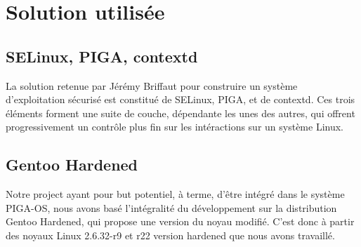 \section{Solution utilisée}


\subsection{SELinux, PIGA, contextd}

La solution retenue par Jérémy Briffaut pour construire un système d'exploitation sécurisé est constitué de SELinux, PIGA, et de contextd. Ces trois éléments forment une suite de couche, dépendante les unes des autres, qui offrent progressivement un contrôle plus fin sur les intéractions sur un système Linux.

\subsection{Gentoo Hardened}

Notre project ayant pour but potentiel, à terme, d'être intégré dans le système PIGA-OS, nous avons basé l'intégralité du développement sur la distribution Gentoo Hardened, qui propose une version du noyau modifié. C'est donc à partir des noyaux Linux 2.6.32-r9 et r22 version hardened que nous avons travaillé.